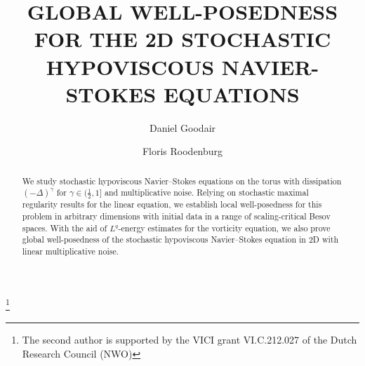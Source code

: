 \documentclass[11pt, a4paper,oneside, reqno]{amsart}
\theoremstyle{remark} %
\theoremstyle{definition} %
\numberwithin{theorem}{section}
\numberwithin{equation}{section}
\newcommand{\gam}{\gamma}
\begin{document}
\author[Goodair]{Daniel Goodair}
\address{Daniel Goodair \hfill\break\indent École Polytechnique Fédérale de Lausanne \hfill\break\indent Bâtiment MA \hfill\break\indent
Station 8\hfill\break{} Lausanne, Switzerland }

\author[Roodenburg]{Floris Roodenburg}
\address{Floris Roodenburg \hfill\break\indent
Delft Institute of Applied Mathematics \hfill\break\indent
Delft University of Technology \hfill\break\indent
P.O. Box 5031 \hfill\break{} GA Delft, The Netherlands}

\title{GLOBAL WELL-POSEDNESS FOR THE 2D STOCHASTIC
HYPOVISCOUS NAVIER-STOKES EQUATIONS}



\thanks{The second author is supported by the VICI grant VI.C.212.027 of the Dutch Research Council (NWO)}

\begin{abstract}
We study stochastic hypoviscous Navier--Stokes equations on the torus with dissipation $(-\Delta)^\gamma$ for $\gam\in (\frac 12,1]$ and multiplicative noise. Relying on stochastic maximal regularity results for the linear equation, we establish local well-posedness for this problem in arbitrary dimensions with initial data in a range of scaling-critical Besov spaces. With the aid of $L^q$-energy estimates for the vorticity equation, we also prove global well-posedness of the stochastic hypoviscous Navier--Stokes equation in 2D with linear multiplicative noise.
\end{abstract}

\maketitle
\setcounter{tocdepth}{1}
\tableofcontents
\end{document}
